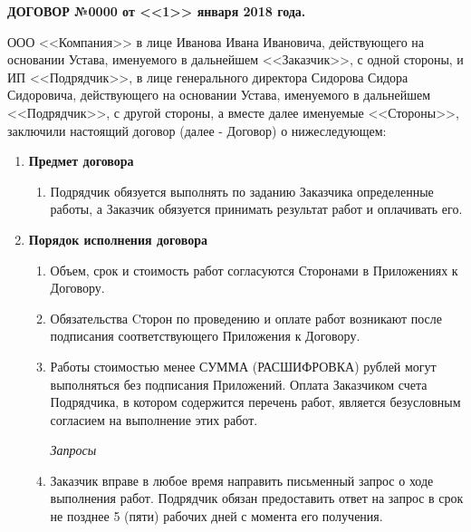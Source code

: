 \documentclass[14pt,a4paper]{article}
\begin{document}
\begin{center}
\textbf{ДОГОВОР №0000 от <<1>> января 2018 года.}
\end{center}

ООО <<Компания>> в лице Иванова Ивана Ивановича, действующего на основании Устава, именуемого в дальнейшем <<Заказчик>>, с одной стороны, и ИП <<Подрядчик>>, в лице генерального директора Сидорова Сидора Сидоровича, действующего на основании Устава, именуемого в дальнейшем <<Подрядчик>>, с другой стороны, а вместе далее именуемые <<Стороны>>, заключили настоящий договор (далее - Договор) о нижеследующем:

\begin{enumerate}
	\item
	\begin{center}
	\textbf{Предмет договора}
	\end{center}
	\begin{enumerate}
		\item Подрядчик обязуется выполнять по заданию Заказчика определенные работы, а Заказчик обязуется принимать результат работ и оплачивать его.
	\end{enumerate}

	\item
	\begin{center}
	\textbf{Порядок исполнения договора}
	\end{center}
	\begin{enumerate}

		\textit{Согласование объема работ}

		\item Объем, срок и стоимость работ согласуются Сторонами в Приложениях к Договору.

		\item Обязательства Cторон по проведению и оплате работ возникают после подписания соответствующего Приложения к Договору.

		\item Работы стоимостью менее СУММА (РАСШИФРОВКА) рублей могут выполняться без подписания Приложений. Оплата Заказчиком счета Подрядчика, в котором содержится перечень работ, является безусловным согласием на выполнение этих работ.

		\textit{Запросы}

		\item Заказчик вправе в любое время направить письменный запрос о ходе выполнения работ. Подрядчик обязан предоставить ответ на запрос в срок не позднее 5 (пяти) рабочих дней с момента его получения.


\end{enumerate}
\end{enumerate}
\end{document}
